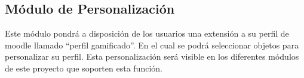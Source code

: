 \subsection*{Módulo de Personalización}

 \noindent
 Este módulo pondrá a disposición de los usuarios una extensión a su perfil de moodle llamado ``perfil gamificado''. En el cual se podrá
 seleccionar objetos para personalizar su perfil. Esta personalización será visible en los diferentes módulos de este proyecto que soporten
 esta función.












